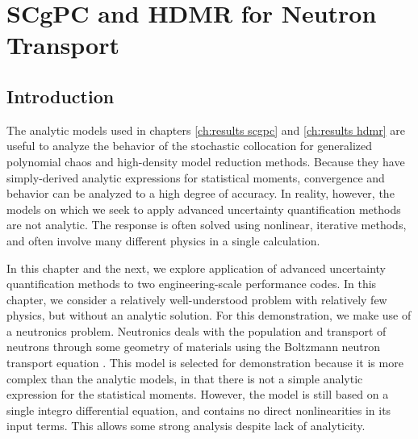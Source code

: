 
\chapter{SCgPC and HDMR for Neutron Transport} %

\label{ch:c5g7} %



\section{Introduction}
The analytic models used in chapters \ref{ch:results scgpc} and \ref{ch:results hdmr} are useful to
analyze the behavior of the stochastic collocation for generalized polynomial chaos and high-density model
reduction methods.  Because they have simply-derived analytic expressions for statistical moments, convergence
and behavior can be analyzed to a high degree of accuracy.  In reality, however, the models on which we seek to apply
advanced uncertainty quantification methods are not analytic.  The response is often solved using nonlinear,
iterative methods, and often involve many different physics in a single calculation.

In this chapter and the next, we explore application of advanced uncertainty quantification methods to two
engineering-scale performance codes.  In this chapter, we consider a relatively well-understood problem with
relatively few physics, but without an analytic solution.  For this demonstration, we make use of a neutronics
problem.  Neutronics deals with the population and transport of neutrons through some geometry of materials
using the Boltzmann neutron transport equation \cite{lewistrans}. This model is selected for demonstration
because it is more complex than the analytic models, in that there is not a simple analytic expression for the
statistical moments.  However, the model is still based on a single integro differential equation, and
contains no direct nonlinearities in its input terms.  This allows some strong analysis despite lack of
analyticity.

